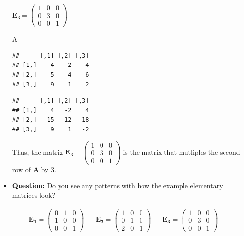 \documentclass[
]{book}
\newenvironment{Shaded}{\begin{snugshade}}{\end{snugshade}}
\newcommand{\CommentTok}[1]{\textcolor[rgb]{0.56,0.35,0.01}{\textit{#1}}}
\newcommand{\DecValTok}[1]{\textcolor[rgb]{0.00,0.00,0.81}{#1}}
\newcommand{\NormalTok}[1]{#1}
\newcommand{\OperatorTok}[1]{\textcolor[rgb]{0.81,0.36,0.00}{\textbf{#1}}}
\newcommand{\StringTok}[1]{\textcolor[rgb]{0.31,0.60,0.02}{#1}}
\theoremstyle{definition}
\theoremstyle{definition}
\theoremstyle{definition}
\theoremstyle{definition}
\theoremstyle{remark}
\begin{document}
\begin{itemize}
  \(\mathbf{E}_3 = \begin{pmatrix} 1 & 0 & 0 \\ 0 & 3 & 0 \\ 0 & 0 & 1 \end{pmatrix}\)

\begin{Shaded}
\begin{Highlighting}[]
\NormalTok{A}
\end{Highlighting}
\end{Shaded}

\begin{verbatim}
##      [,1] [,2] [,3]
## [1,]    4   -2    4
## [2,]    5   -4    6
## [3,]    9    1   -2
\end{verbatim}

\begin{Shaded}
\end{Shaded}

\begin{verbatim}
##      [,1] [,2] [,3]
## [1,]    4   -2    4
## [2,]   15  -12   18
## [3,]    9    1   -2
\end{verbatim}

  Thus, the matrix \(\mathbf{E}_3 = \begin{pmatrix} 1 & 0 & 0 \\ 0 & 3 & 0 \\ 0 & 0 & 1 \end{pmatrix}\) is the matrix that mutliples the second row of \(\mathbf{A}\) by 3.
\item
  \textbf{Question:} Do you see any patterns with how the example elementary matrices look?
\end{itemize}

\[
\begin{aligned}
\mathbf{E_1} = \begin{pmatrix} 0 & 1 & 0 \\ 1 & 0 & 0 \\ 0 & 0 & 1 \end{pmatrix} && \mathbf{E_2} = \begin{pmatrix} 1 & 0 & 0 \\ 0 & 1 & 0 \\ 2 & 0 & 1 \end{pmatrix} && \mathbf{E_3} = \begin{pmatrix} 1 & 0 & 0 \\ 0 & 3 & 0 \\ 0 & 0 & 1 \end{pmatrix}
\end{aligned}
\]
\end{document}
